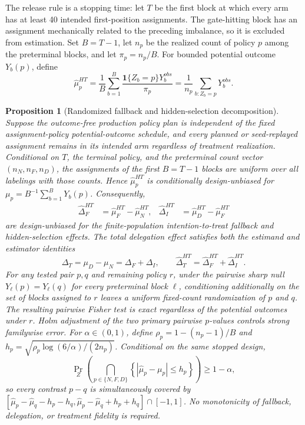 \documentclass[11pt]{article}
\newcommand{\1}{\mathbf{1}}
\newtheorem{proposition}{Proposition}
\begin{document}
The release rule is a stopping time: let $T$ be the first block at which every
arm has at least 40 intended first-position assignments.  The gate-hitting block has an
assignment mechanically related to the preceding imbalance, so it is excluded
from estimation.  Set $B=T-1$, let $n_p$ be the realized count of policy $p$
among the preterminal blocks, and let $\pi_p=n_p/B$.  For bounded potential
outcome $Y_b(p)$, define
\begin{equation}
 \widehat{\mu}^{HT}_p=\frac{1}{B}\sum_{b=1}^B
 \frac{\1\{Z_b=p\}Y_b^{obs}}{\pi_p}
 =\frac{1}{n_p}\sum_{b:Z_b=p}Y_b^{obs}.
 \label{eq:h81-ht}
\end{equation}

\begin{proposition}[Randomized fallback and hidden-selection decomposition]
\label{prop:delegation-decomposition}
Suppose the outcome-free production policy plan is independent of the fixed
assignment-policy potential-outcome schedule, and every planned or seed-replayed
assignment remains in its intended arm regardless of treatment realization.
Conditional on $T$, the terminal policy, and the
preterminal count vector $(n_N,n_F,n_D)$, the assignments of the first $B=T-1$
blocks are uniform over all labelings with those counts.  Hence
$\widehat{\mu}^{HT}_p$ is conditionally design-unbiased for
$\mu_p=B^{-1}\sum_{b=1}^B Y_b(p)$.  Consequently,
\begin{align}
 \widehat{\Delta}^{HT}_{F}&=\widehat{\mu}^{HT}_F-
 \widehat{\mu}^{HT}_N, &
 \widehat{\Delta}^{HT}_{I}&=\widehat{\mu}^{HT}_D-
 \widehat{\mu}^{HT}_F
 \label{eq:h81-components}
\end{align}
are design-unbiased for the finite-population intention-to-treat fallback and
hidden-selection effects.  The total delegation effect satisfies both the
estimand and estimator
identities
\begin{equation}
 \Delta_T=\mu_D-\mu_N=\Delta_F+\Delta_I,
 \qquad
 \widehat{\Delta}^{HT}_T=
 \widehat{\Delta}^{HT}_F+\widehat{\Delta}^{HT}_I.
 \label{eq:h81-identity}
\end{equation}
For any tested pair $p,q$ and remaining policy $r$, under the pairwise sharp null
$Y_\ell(p)=Y_\ell(q)$ for every preterminal block $\ell$, conditioning
additionally on the set of blocks assigned to $r$ leaves a uniform fixed-count
randomization of $p$ and $q$.  The resulting pairwise Fisher test is exact
regardless of the potential outcomes under $r$.  Holm adjustment of the two
primary pairwise $p$-values controls strong familywise error.  For
$\alpha\in(0,1)$, define $\rho_p=1-(n_p-1)/B$ and
$h_p=\sqrt{\rho_p\log(6/\alpha)/(2n_p)}$.  Conditional on
the same stopped design,
\begin{equation}
 \Pr_Z\!\left(\bigcap_{p\in\{N,F,D\}}
 \left\{|\widehat\mu_p-\mu_p|\le h_p\right\}\right)\ge 1-\alpha,
 \label{eq:h81-hoeffding-means}
\end{equation}
so every contrast $p-q$ is simultaneously covered by
$[\widehat\mu_p-\widehat\mu_q-h_p-h_q,
  \widehat\mu_p-\widehat\mu_q+h_p+h_q]\cap[-1,1]$.
No monotonicity of fallback, delegation, or treatment fidelity is required.
\end{proposition}
\end{document}
